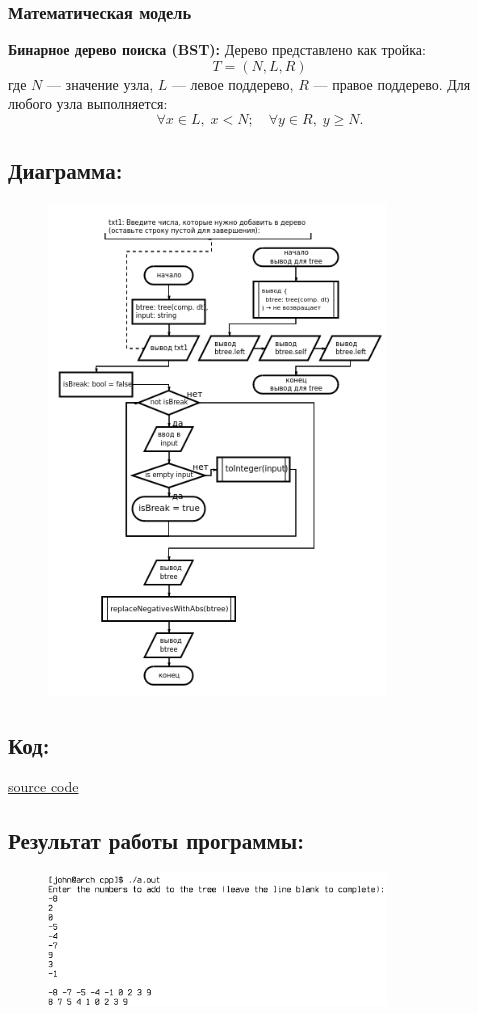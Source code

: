 \documentclass[a4paper,12pt]{article}
\begin{document}
\subsubsection{Математическая модель}
\textbf{Бинарное дерево поиска (BST):} Дерево представлено как тройка:
\[ T = (N, L, R) \]
где \(N\) — значение узла, \(L\) — левое поддерево, \(R\) — правое поддерево. Для любого узла выполняется:
\[ \forall x \in L, \; x < N; \quad \forall y \in R, \; y \geq N. \]
\subsection{Диаграмма:}
\begin{figure}[h]
  \centering
  \includegraphics[width=0.8\textwidth]{data/diagram17.png}
\end{figure}
\subsection{Код:}

\href{https://raw.githubusercontent.com/John1400800/stuff/refs/heads/main/c_learning/home_works/task17.cpp}{source code}
\subsection{Результат работы программы:}
\begin{figure}[h]
  \includegraphics[width=0.8\textwidth]{data/demo17.png}
\end{figure}
\end{document}
